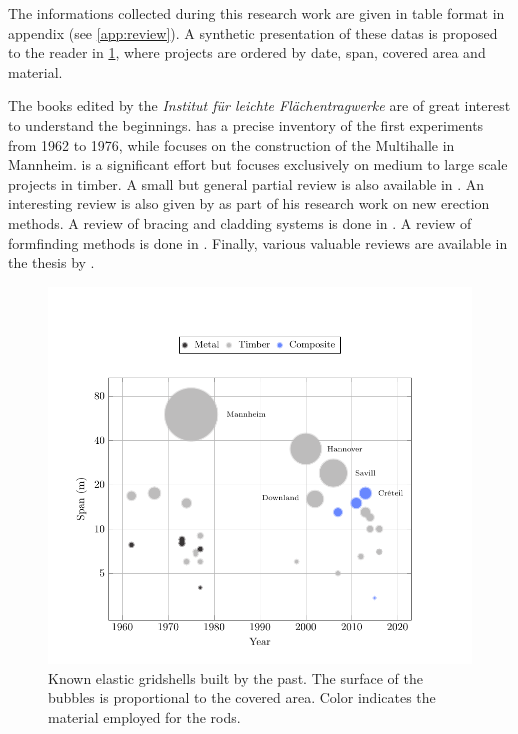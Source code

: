 The informations collected during this research work are given in table format in appendix (see \cref{app:review}). A synthetic presentation of these datas is proposed to the reader in \cref{fig:projectsbymaterial}, where projects are ordered by date, span, covered area and material.

The books edited by the \emph{Institut für leichte Flächentragwerke} are of great interest to understand the beginnings.  \cite{IL10} has a precise inventory of the first experiments from 1962 to 1976, while  \cite{IL13} focuses on the construction of the Multihalle in Mannheim.  \cite{Chilton2017} is a significant effort but focuses exclusively on medium to large scale projects in timber. A small but general partial review is also available in \cite{Collins2016}. An interesting review is also given by \citet{Quinn2014} as part of his research work on new erection methods. A review of bracing and cladding systems is done in \cite{Cuvilliers2017}. A review of formfinding methods is done in \cite{Vaulot2016}. Finally, various valuable reviews are available in the thesis by \citet{Douthe2007, Bouhaya2010, Tayeb2015a, Lafuente2015}.
\begin{figure}[p]
\begin{fullpage}
	\centering
	\includegraphics[]{ch1_gridshell/plot/1_projects/build.pdf}
	\caption[Known elastic gridshells built by the past.]{Known elastic gridshells built by the past. The surface of the bubbles is proportional to the covered area. Color indicates the material employed for the rods.}
	\label{fig:projectsbymaterial}
\end{fullpage}
\end{figure}

